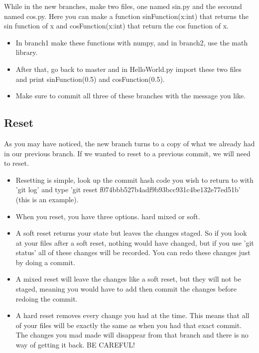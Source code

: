 \documentclass{beamer}
\begin{document}
\begin{frame}
While in the new branches, make two files, one named sin.py and the secound 
named cos.py. Here you can make a function sinFunction(x:int) that returns the 
sin function of x and cosFunction(x:int) that return the cos function of x.
\begin{itemize}
\item In branch1 make these functions with numpy, and in branch2, use the math 
library.
\item After that, go back to master and in HelloWorld.py import these 
two files and print sinFunction(0.5) and cosFunction(0.5).
\item Make sure to commit all three of these branches with the message you like.
\end{itemize}
\end{frame}

\subsection{Reset}
\begin{frame}
As you may have noticed, the new branch turns to a copy of what we already had 
in our previous branch. If we wanted to reset to a previous commit, we will 
need to reset.
\begin{itemize}
\item Resetting is simple, look up the commit hash code you wish to return to 
with 'git log' and type 'git reset f074bbb527b4adf9b93bcc931c4be132e77ed51b' 
(this is an example).
\item When you reset, you have three options. hard mixed or soft.
\end{itemize}
\end{frame}

\begin{frame}
\begin{itemize}
\item A soft reset returns your state but leaves the changes staged. So if you 
look at your files after a soft reset, nothing would have changed, but if you 
use 'git status' all of these changes will be recorded. You can redo these 
changes just by doing a commit.
\item A mixed reset will leave the changes like a soft reset, but they will not 
be staged, meaning you would have to add then commit the changes before redoing 
the commit.
\item A hard reset removes every change you had at the time. This means that 
all of your files will be exactly the same as when you had that exact commit. 
The changes you mad made will disappear from that branch and there is no way of 
getting it back. BE CAREFUL!
\end{itemize}

\end{frame}
\end{document}
